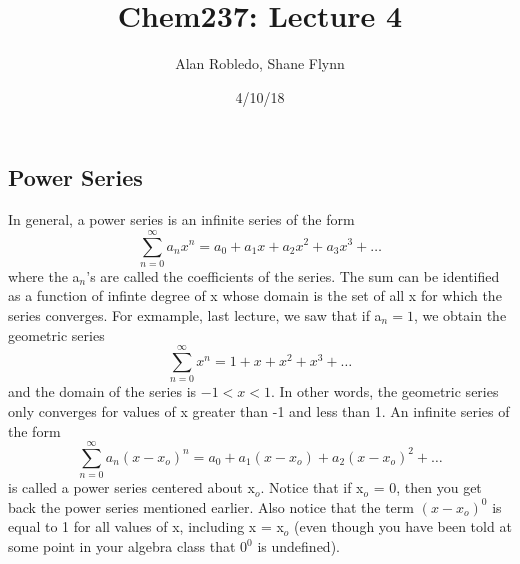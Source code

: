 \documentclass{article}
\title{Chem237: Lecture 4}
\date{4/10/18}
\author{Alan Robledo, Shane Flynn}
\newcommand{\be}{\begin{equation}}
\newcommand{\ee}{\end{equation}}
\newcommand{\sumzero}{\sum_{n=0}^\infty}
\begin{document}
\maketitle

\subsection*{Power Series}
In general, a power series is an infinite series of the form
\be
\sumzero a_n x^n = a_0 + a_1 x + a_2 x^2 + a_3 x^3 + \hdots
\ee
where the a$_n$'s are called the coefficients of the series.
The sum can be identified as a function of infinte degree of x whose domain is the set of all x for which the series converges.
For exmample, last lecture, we saw that if a$_n = 1$, we obtain the geometric series
\be
\sumzero x^n = 1 + x + x^2 + x^3 + \hdots
\ee
and the domain of the series is $-1 < x < 1$.
In other words, the geometric series only converges for values of x greater than -1 and less than 1.
An infinite series of the form
\be
\sumzero a_n (x - x_o)^n = a_0 + a_1 (x - x_o) + a_2 (x - x_o)^2 + \hdots
\ee
is called a power series centered about x$_o$.
Notice that if x$_o$ = 0, then you get back the power series mentioned earlier.
Also notice that the term $(x - x_o)^0$ is equal to 1 for all values of x, including x = x$_o$ (even though you have been told at some point in your algebra class that $0^0$ is undefined).
\end{document}
